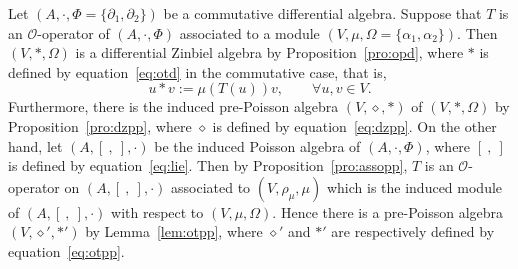 \documentclass[pdftex]{sigma}
\numberwithin{equation}{section}
\begin{document}
Let $(A, \cdot, \Phi = \{\partial_1, \partial_2\})$ be a commutative differential algebra.
Suppose that $T$ is an $\mathcal{O}$-operator of $(A, \cdot, \Phi)$ associated to a module $(V, \mu, \Omega = \{\alpha_1, \alpha_2\})$.
Then $(V, \ast, \Omega)$ is a differential Zinbiel algebra by Proposition~\ref{pro:opd}, where $\ast$ is defined by equation~\eqref{eq:otd} in the commutative case, that is,
\begin{equation}
 u \ast v := \mu(T(u)) v, \qquad \forall u,v \in V. \label{eq:Zin11}
\end{equation}
Furthermore, there is the induced pre-Poisson algebra $(V,
\diamond, \ast)$ of $(V, \ast, \Omega)$ by
Proposition~\ref{pro:dzpp}, where $\diamond$ is defined by
equation~\eqref{eq:dzpp}. On the other hand, let $(A, [\ ,\ ], \cdot)$
be the induced Poisson algebra of $(A, \cdot, \Phi)$, where $[\ ,\
]$ is defined by equation~\eqref{eq:lie}. Then by
Proposition~\ref{pro:assopp}, $T$ is an $\mathcal O$-operator on
$(A, [\ ,\ ], \cdot)$ associated to $(V, \rho_\mu, \mu)$ which is
the induced module of $(A, [\ ,\ ], \cdot)$ with respect
to $(V, \mu, \Omega)$. Hence there is a pre-Poisson algebra $(V,
\diamond', \ast')$ by Lemma~\ref{lem:otpp}, where $\diamond'$ and
$\ast'$ are respectively defined by equation~\eqref{eq:otpp}.
\end{document}
